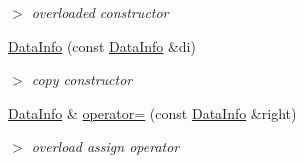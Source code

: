 \begin{DoxyCompactItemize}
\begin{DoxyCompactList}\small\item\em $>$ overloaded constructor \end{DoxyCompactList}\item 
\hypertarget{structDataInfo_a5a03054fee669280156924370ff2ab1f}{\hyperlink{structDataInfo_a5a03054fee669280156924370ff2ab1f}{\-Data\-Info} (const \hyperlink{structDataInfo}{\-Data\-Info} \&di)}\label{structDataInfo_a5a03054fee669280156924370ff2ab1f}

\begin{DoxyCompactList}\small\item\em $>$ copy constructor \end{DoxyCompactList}\item 
\hypertarget{structDataInfo_af4a3fb2cbeeab5114f598aabda4b93fb}{\hyperlink{structDataInfo}{\-Data\-Info} \& \hyperlink{structDataInfo_af4a3fb2cbeeab5114f598aabda4b93fb}{operator=} (const \hyperlink{structDataInfo}{\-Data\-Info} \&right)}\label{structDataInfo_af4a3fb2cbeeab5114f598aabda4b93fb}

\begin{DoxyCompactList}\small\item\em $>$ overload assign operator \end{DoxyCompactList}\end{DoxyCompactItemize}
